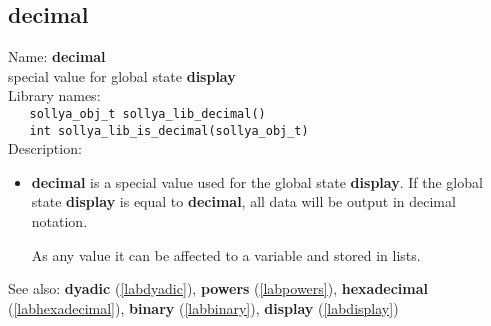 \subsection{decimal}
\label{labdecimal}
\noindent Name: \textbf{decimal}\\
\phantom{aaa}special value for global state \textbf{display}\\[0.2cm]
\noindent Library names:\\
\verb|   sollya_obj_t sollya_lib_decimal()|\\
\verb|   int sollya_lib_is_decimal(sollya_obj_t)|\\[0.2cm]
\noindent Description: \begin{itemize}

\item \textbf{decimal} is a special value used for the global state \textbf{display}.
   If the global state \textbf{display} is equal to \textbf{decimal}, all data will
   be output in decimal notation.
    
   As any value it can be affected to a variable and stored in lists.
\end{itemize}
See also: \textbf{dyadic} (\ref{labdyadic}), \textbf{powers} (\ref{labpowers}), \textbf{hexadecimal} (\ref{labhexadecimal}), \textbf{binary} (\ref{labbinary}), \textbf{display} (\ref{labdisplay})
